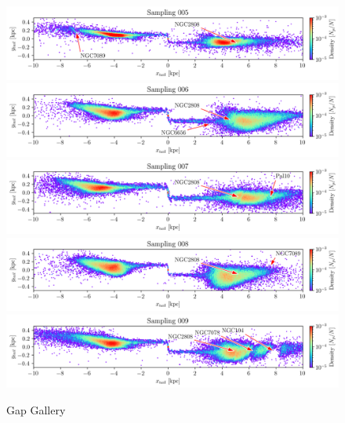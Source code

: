 \documentclass[]{aa}
\begin{document}
\begin{appendix}
    \begin{figure}
      \centering
      \includegraphics[width=\linewidth]{gallery_of_gaps_monte-carlo-005.png}
      \includegraphics[width=\linewidth]{gallery_of_gaps_monte-carlo-006.png}
      \includegraphics[width=\linewidth]{gallery_of_gaps_monte-carlo-007.png}
      \includegraphics[width=\linewidth]{gallery_of_gaps_monte-carlo-008.png}
      \includegraphics[width=\linewidth]{gallery_of_gaps_monte-carlo-009.png}
      \caption{Gap Gallery}
      \label{fig:TailCoordinates}
    \end{figure}        



\end{appendix}
\end{document}
